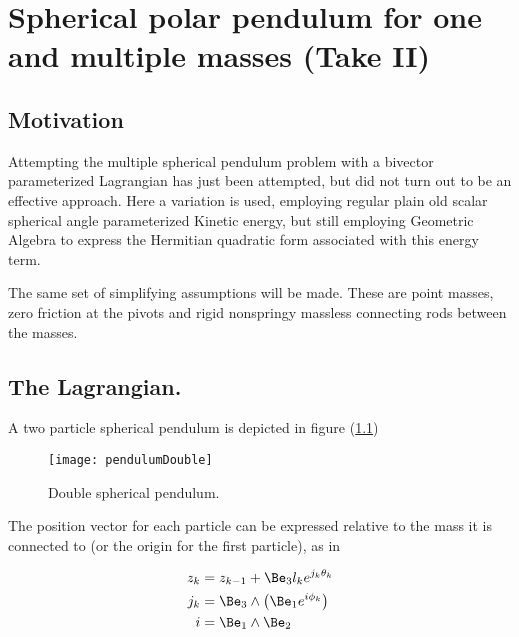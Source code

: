 

\chapter{Spherical polar pendulum for one and multiple masses (Take II)}
\label{chap:multiPendulumSpherical2}
{}
\date{Nov 4, 2009}

\beginArtWithToc

\section{Motivation}

Attempting the multiple spherical pendulum problem with a bivector parameterized Lagrangian has just been attempted, but did not turn out to be an effective approach.  Here a variation is used, employing regular plain old scalar spherical angle parameterized Kinetic energy, but still employing Geometric Algebra to express the Hermitian quadratic form associated with this energy term.

The same set of simplifying assumptions will be made.  These are point masses, zero friction at the pivots and rigid nonspringy massless connecting rods between the masses.

\section{The Lagrangian.}

A two particle spherical pendulum is depicted in figure (\ref{fig:sPolarMultiPendulum:pendulumDouble})

\begin{figure}[htp]
\centering
\texttt{[image: pendulumDouble]}
\caption{Double spherical pendulum.}\label{fig:sPolarMultiPendulum:pendulumDouble}
\end{figure}

The position vector for each particle can be expressed relative to the mass it is connected to (or the origin for the first particle), as in

\begin{align}\label{eqn:multiPendulumSpherical2:boo1}
z_k &= z_{k-1} + \Be_3 l_k e^{j_k \theta_k} \\
j_k &= \Be_3 \wedge \left( \Be_1 e^{i \phi_k} \right) \\
i &= \Be_1 \wedge \Be_2
\end{align}

